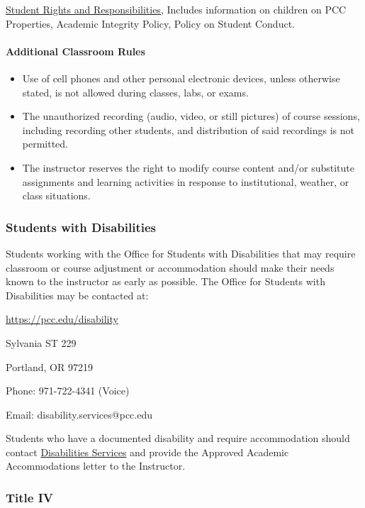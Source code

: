 \documentclass[11pt]{article}
\begin{document}
\href{http://www.pcc.edu/about/policy/student-rights/}{Student Rights
and Responsibilities}, Includes information on children on PCC
Properties, Academic Integrity Policy, Policy on Student Conduct.

\hypertarget{additional-classroom-rules}{%
\paragraph{Additional Classroom
Rules}\label{additional-classroom-rules}}

\begin{itemize}
\item
  Use of cell phones and other personal electronic devices, unless
  otherwise stated, is not allowed during classes, labs, or exams.
\item
  The unauthorized recording (audio, video, or still pictures) of course
  sessions, including recording other students, and distribution of said
  recordings is not permitted.
\item
  The instructor reserves the right to modify course content and/or
  substitute assignments and learning activities in response to
  institutional, weather, or class situations.
\end{itemize}

    \hypertarget{students-with-disabilities}{%
\subsubsection{Students with
Disabilities}\label{students-with-disabilities}}

Students working with the Office for Students with Disabilities that may
require classroom or course adjustment or accommodation should make
their needs known to the instructor as early as possible. The Office for
Students with Disabilities may be contacted at:

\url{https://pcc.edu/disability}

Sylvania ST 229

Portland, OR 97219

Phone: 971-722-4341 (Voice)

Email: disability.services@pcc.edu

Students who have a documented disability and require accommodation
should contact
\href{http://www.pcc.edu/resources/disability}{Disabilities Services}
and provide the Approved Academic Accommodations letter to the
Instructor.

    \hypertarget{title-iv}{%
\subsubsection{Title IV}\label{title-iv}}
\end{document}
